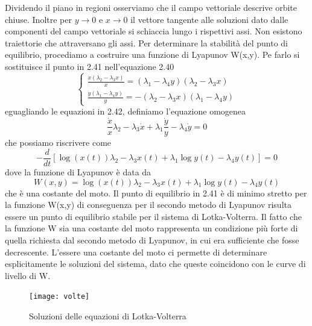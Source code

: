 Dividendo il piano in regioni osserviamo che  il campo vettoriale descrive orbite chiuse. Inoltre per $y \rightarrow 0 $ e $x \rightarrow 0$ il vettore tangente alle soluzioni dato dalle componenti del campo vettoriale si schiaccia lungo i rispettivi assi. Non esistono traiettorie che attraversano gli assi.\newline
Per determinare la stabilit\`{a} del punto di equilibrio, procediamo a costruire una funzione di Lyapunov W(x,y). Pe farlo si sostituisce il punto in 2.41 nell'equazione 2.40
\newpage
\begin{equation}
\left\{\begin{array}{l}
\frac{\dot{x}\left(\lambda_2-\lambda_3 x\right)}{x}=\left(\lambda_1-\lambda_4 y\right)\left(\lambda_2-\lambda_3 x\right) \\
\frac{\dot{y}\left(\lambda_1-\lambda_4 y\right)}{y}=-\left(\lambda_2-\lambda_3 x\right)\left(\lambda_1-\lambda_4 y\right)
\end{array}\right.
\end{equation}
eguagliando le equazioni in 2.42, definiamo l'equazione omogenea 
\begin{equation}
\frac{\dot{x}}{x} \lambda_2-\lambda_3 \dot{x}+\lambda_1 \frac{\dot{y}}{y}-\lambda_4 \dot{y}=0
\end{equation}
che possiamo riscrivere come
\begin{equation}
-\frac{d}{d t}\left[\log (x(t)) \lambda_2-\lambda_3 x(t)+\lambda_1 \log y(t)-\lambda_4 y(t)\right]=0
\end{equation}
dove la funzione di Lyapunov \`{e} data da 
\begin{equation}
	W(x,y) = \log (x(t)) \lambda_2-\lambda_3 x(t)+\lambda_1 \log y(t)-\lambda_4 y(t)
\end{equation}
che \`{e} una costante del moto. Il punto di equilibrio in 2.41 \`{e} di minimo stretto per la funzione W(x,y) di conseguenza per il secondo metodo di Lyapunov risulta essere un punto di equilibrio stabile per il sistema di Lotka-Volterra. Il fatto che la funzione W sia una costante del moto rappresenta un condizione pi\`{u} forte di quella richiesta dal secondo metodo di Lyapunov, in cui era sufficiente che fosse decrescente. L'essere una costante del moto ci permette di determinare esplicitamente le soluzioni del sistema, dato che queste coincidono con le curve di livello di W.

\begin{figure}[!ht]
\vspace{0.1in}
\texttt{[image: volte]}	
\centering
\caption{Soluzioni delle equazioni di Lotka-Volterra}
\end{figure}

